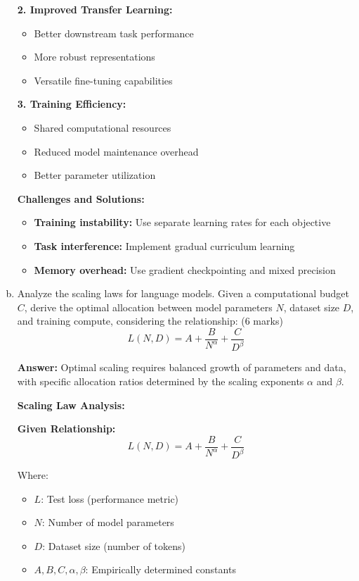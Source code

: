 \documentclass[12pt]{article}
\newcommand{\answer}[1]{{\color{answercolor}\textbf{Answer:} #1}}
\newcommand{\explanation}[1]{{\color{explanationcolor}#1}}
\begin{document}
\begin{center}
\begin{enumerate}[(a)]
{    \textbf{2. Improved Transfer Learning:}
    \begin{itemize}
        \item Better downstream task performance
        \item More robust representations
        \item Versatile fine-tuning capabilities
    \end{itemize}
    
    \textbf{3. Training Efficiency:}
    \begin{itemize}
        \item Shared computational resources
        \item Reduced model maintenance overhead
        \item Better parameter utilization
    \end{itemize}
    
    \textbf{Challenges and Solutions:}
    \begin{itemize}
        \item \textbf{Training instability:} Use separate learning rates for each objective
        \item \textbf{Task interference:} Implement gradual curriculum learning
        \item \textbf{Memory overhead:} Use gradient checkpointing and mixed precision
    \end{itemize}
    }
    
    \item Analyze the scaling laws for language models. Given a computational budget $C$, derive the optimal allocation between model parameters $N$, dataset size $D$, and training compute, considering the relationship: \hfill (6 marks)
    $$L(N, D) = A + \frac{B}{N^{\alpha}} + \frac{C}{D^{\beta}}$$
    
    \answer{Optimal scaling requires balanced growth of parameters and data, with specific allocation ratios determined by the scaling exponents $\alpha$ and $\beta$.}
    
    \explanation{
    \textbf{Scaling Law Analysis:}
    
    \textbf{Given Relationship:}
    $$L(N, D) = A + \frac{B}{N^{\alpha}} + \frac{C}{D^{\beta}}$$
    
    Where:
    \begin{itemize}
        \item $L$: Test loss (performance metric)
        \item $N$: Number of model parameters
        \item $D$: Dataset size (number of tokens)
        \item $A, B, C, \alpha, \beta$: Empirically determined constants
    \end{itemize}
    
}
\end{enumerate}
\end{center}
\end{document}
